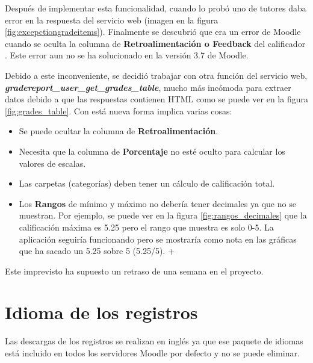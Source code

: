
Después de implementar esta funcionalidad, cuando lo probó uno de tutores daba error en la respuesta del servicio web (imagen en la figura \ref{fig:excepctiongradeitems}). Finalmente se descubrió que era un error de Moodle cuando se oculta la columna de \textbf{Retroalimentación o Feedback} del calificador \cite{zadok_[mdl-64298]_nodate}. Este error aun no se ha solucionado en la versión 3.7 de Moodle.  


Debido a este inconveniente, se decidió trabajar con otra función del servicio web, \textbf{\textit{gradereport\_user\_get\_grades\_table}}, mucho más incómoda para extraer datos debido a que las respuestas contienen HTML como se puede ver en la figura \ref{fig:grades_table}. Con está nueva forma implica varias cosas:
\begin{itemize}
	\item Se puede ocultar la columna de \textbf{Retroalimentación}.
	\item Necesita que la columna de \textbf{Porcentaje} no esté oculto para calcular los valores de escalas.
	\item Las carpetas (categorías) deben tener un cálculo de calificación total.
	\item Los \textbf{Rangos} de mínimo y máximo no debería tener decimales ya que no se muestran. Por ejemplo, se puede ver en la figura \ref{fig:rangos_decimales} que la calificación máxima es 5.25 pero el rango que muestra es solo 0-5. La aplicación seguiría funcionando pero se mostraría como nota en las gráficas que ha sacado un 5.25 sobre 5 (5.25/5).
	+
\end{itemize}

Este imprevisto ha supuesto un retraso de una semana en el proyecto.


\section{Idioma de los registros}
Las descargas de los registros se realizan en inglés ya que ese paquete de idiomas está incluido en todos los servidores Moodle por defecto y no se puede eliminar.

